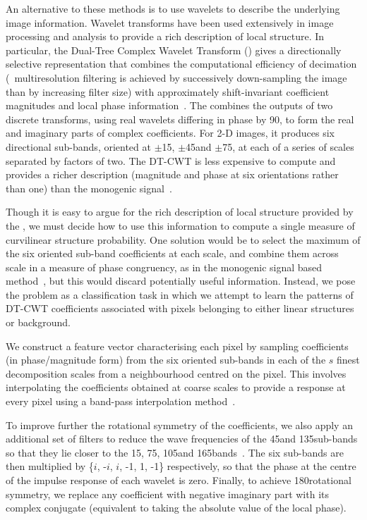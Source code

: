 An alternative to these methods is to use wavelets to describe the underlying image information. Wavelet transforms have been used extensively in image processing and analysis to provide a rich description of local structure. In particular, the Dual-Tree Complex Wavelet Transform (\dtcwt{}) gives a directionally selective representation that combines the computational efficiency of decimation (\ie~multiresolution filtering is achieved by successively down-sampling the image than by increasing filter size) with approximately shift-invariant coefficient magnitudes and local phase information~\cite{Kingsbury_ACHA01}. The \dtcwt{} combines the outputs of two discrete transforms, using real wavelets differing in phase by 90\deg, to form the real and imaginary parts of complex coefficients. For 2-D images, it produces six directional sub-bands, oriented at $\pm$15\deg, $\pm$45\deg and $\pm$75\deg, at each of a series of scales separated by factors of two. The DT-CWT is less expensive to compute and provides a richer description (magnitude and phase at six orientations rather than one) than the monogenic signal~\cite{Wai_etal_MICCAI04}.

Though it is easy to argue for the rich description of local structure provided by the \dtcwt{}, we must decide how to use this information to compute a single measure of curvilinear structure probability. One solution would be to select the maximum of the six oriented sub-band coefficients at each scale, and combine them across scale in a measure of phase congruency, as in the monogenic signal based method~\cite{Wai_etal_MICCAI04}, but this would discard potentially useful information. Instead, we pose the problem as a classification task in which we attempt to learn the patterns of DT-CWT coefficients associated with pixels belonging to either linear structures or background. 

We construct a feature vector characterising each pixel by sampling \dtcwt{} coefficients (in phase/magnitude form) from the six oriented sub-bands in each of the $s$ finest decomposition scales from a neighbourhood centred on the pixel. This involves interpolating the coefficients obtained at coarse scales to provide a response at every pixel using a band-pass interpolation method~\cite{Anderson_etal_ICIP05}. 

To improve further the rotational symmetry of the coefficients, we also apply an additional set of filters to reduce the wave frequencies of the 45\deg and 135\deg sub-bands so that they lie closer to the 15\deg, 75\deg, 105\deg and 165\deg bands~\cite{Kingsbury_ECSP06,Berks_etal_IPMI11}. The six sub-bands are then multiplied by \{$i$, -$i$, $i$, -1, 1, -1\} respectively, so that the phase at the centre of the impulse response of each wavelet is zero. Finally, to achieve 180\deg rotational symmetry, we replace any coefficient with negative imaginary part with its complex conjugate (equivalent to taking the absolute value of the local phase).

